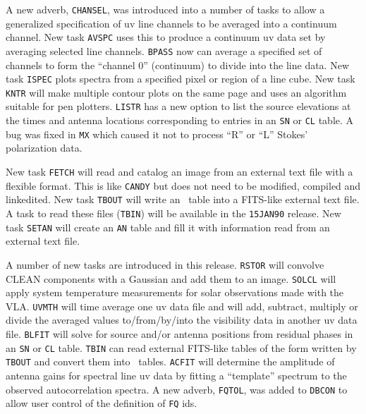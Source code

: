 A new adverb, {\tt CHANSEL}, was introduced into a number of tasks to allow
a generalized specification of uv line channels to be averaged into a
continuum channel.  New task {\tt AVSPC} uses this to produce a continuum uv
data set by averaging selected line channels.  {\tt BPASS} now can average a
specified set of channels to form the ``channel 0'' (continuum) to
divide into the line data.
New task {\tt ISPEC} plots spectra from a specified pixel or region
of a line cube.
New task {\tt KNTR} will make multiple contour plots on the same
page and uses an algorithm suitable for pen plotters.  {\tt LISTR} has a new
option to list the source elevations at the times and antenna
locations corresponding to entries in an {\tt SN} or {\tt CL} table.
A bug was fixed in {\tt MX} which caused it not to process ``R'' or
``L'' Stokes' polarization data.

   New task {\tt FETCH} will read and catalog an image from an external text
file with a flexible format.  This is like {\tt CANDY} but does not need to
be modified, compiled and linkedited.  New task {\tt TBOUT} will write an
\AIPS\  table into a FITS-like external text file.  A task to read
these files ({\tt TBIN}) will be available in the {\tt 15JAN90}
release.  New task {\tt SETAN} will create an {\tt AN} table and fill
it with information read from an external text file.


A number of new tasks are introduced in this release.
{\tt RSTOR} will convolve CLEAN components with a Gaussian and
add them to an image.
{\tt SOLCL} will apply system temperature measurements for solar
observations made with the VLA.
{\tt UVMTH} will time average one uv data file and will add,
subtract, multiply or divide the averaged values to/from/by/into the
visibility data in another uv data file.
{\tt BLFIT} will solve for source and/or antenna positions from
residual phases in an {\tt SN} or {\tt CL} table.
{\tt TBIN} can read external FITS-like tables of the form written
by {\tt TBOUT} and convert them into \AIPS\ tables.
{\tt ACFIT} will determine the amplitude of antenna gains for spectral line
uv data by fitting a ``template'' spectrum to the observed
autocorrelation spectra.
A new adverb, {\tt FQTOL}, was added to {\tt DBCON} to allow user
control of the definition of {\tt FQ} ids.

